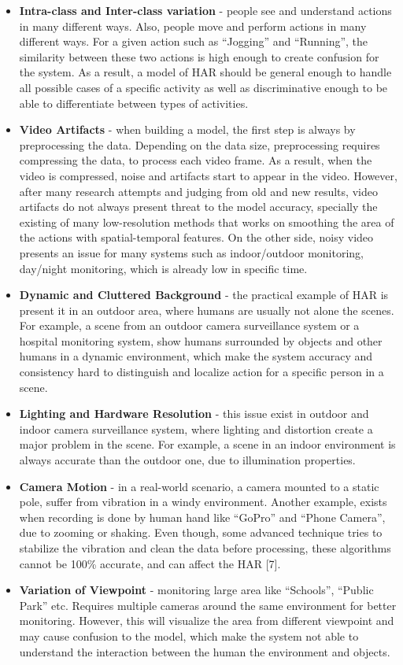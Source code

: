 \begin{itemize}
\item \textbf{Intra-class and Inter-class variation} - people see and understand actions in many different ways. Also, people move and perform actions in many different ways. For a given action such as “Jogging” and “Running”, the similarity between these two actions is high enough to create confusion for the system. As a result, a model of HAR should be general enough to handle all possible cases of a specific activity as well as discriminative enough to be able to differentiate between types of activities.
\item \textbf{Video Artifacts} - when building a model, the first step is always by preprocessing the data. Depending on the data size, preprocessing requires compressing the data, to process each video frame. As a result, when the video is compressed, noise and artifacts start to appear in the video. However, after many research attempts and judging from old and new results, video artifacts do not always present threat to the model accuracy, specially the existing of many low-resolution methods that works on smoothing the area of the actions with spatial-temporal features. On the other side, noisy video presents an issue for many systems such as indoor/outdoor monitoring, day/night monitoring, which is already low in specific time.
\item \textbf{Dynamic and Cluttered Background} - the practical example of HAR is present it in an outdoor area, where humans are usually not alone the scenes. For example, a scene from an outdoor camera surveillance system or a hospital monitoring system, show humans surrounded by objects and other humans in a dynamic environment, which make the system accuracy and consistency hard to distinguish and localize action for a specific person in a scene.
\item \textbf{Lighting and Hardware Resolution} - this issue exist in outdoor and indoor camera surveillance system, where lighting and distortion create a major problem in the scene. For example, a scene in an indoor environment is always accurate than the outdoor one, due to illumination properties.
\item \textbf{Camera Motion} - in a real-world scenario, a camera mounted to a static pole, suffer from vibration in a windy environment. Another example, exists when recording is done by human hand like “GoPro” and “Phone Camera”, due to zooming or shaking. Even though, some advanced technique tries to stabilize the vibration and clean the data before processing, these algorithms cannot be 100\% accurate, and can affect the HAR [7].
\item \textbf{Variation of Viewpoint} - monitoring large area like “Schools”, “Public Park” etc. Requires multiple cameras around the same environment for better monitoring. However, this will visualize the area from different viewpoint and may cause confusion to the model, which make the system not able to understand the interaction between the human the environment and objects.
\end{itemize}

